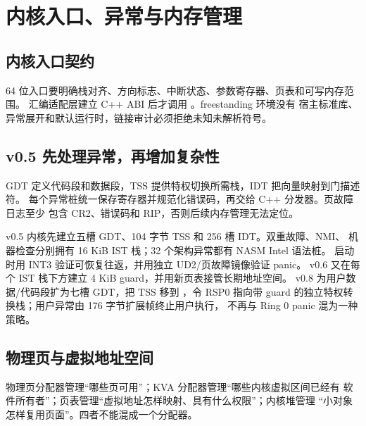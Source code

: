 \section{内核入口、异常与内存管理}

\subsection{内核入口契约}

64 位入口要明确栈对齐、方向标志、中断状态、参数寄存器、页表和可写内存范围。
汇编适配层建立 C++ ABI 后才调用 。freestanding 环境没有
宿主标准库、异常展开和默认运行时，链接审计必须拒绝未知未解析符号。

\subsection{v0.5 先处理异常，再增加复杂性}

GDT 定义代码段和数据段，TSS 提供特权切换所需栈，IDT 把向量映射到门描述符。
每个异常桩统一保存寄存器并规范化错误码，再交给 C++ 分发器。页故障日志至少
包含 CR2、错误码和 RIP，否则后续内存管理无法定位。

v0.5 内核先建立五槽 GDT、104 字节 TSS 和 256 槽 IDT。双重故障、NMI、
机器检查分别拥有 16 KiB IST 栈；32 个架构异常都有 NASM Intel 语法桩。
启动时用 INT3 验证可恢复往返，并用独立 UD2/页故障镜像验证 panic。
v0.6 又在每个 IST 栈下方建立 4 KiB guard，并用新页表接管长期地址空间。
v0.8 为用户数据/代码段扩为七槽 GDT，把 TSS 移到 ，令 RSP0
指向带 guard 的独立特权转换栈；用户异常由 176 字节扩展帧终止用户执行，
不再与 Ring 0 panic 混为一种策略。

\subsection{物理页与虚拟地址空间}

物理页分配器管理“哪些页可用”；KVA 分配器管理“哪些内核虚拟区间已经有
软件所有者”；页表管理“虚拟地址怎样映射、具有什么权限”；内核堆管理
“小对象怎样复用页面”。四者不能混成一个分配器。

\begin{center}
\end{center}

